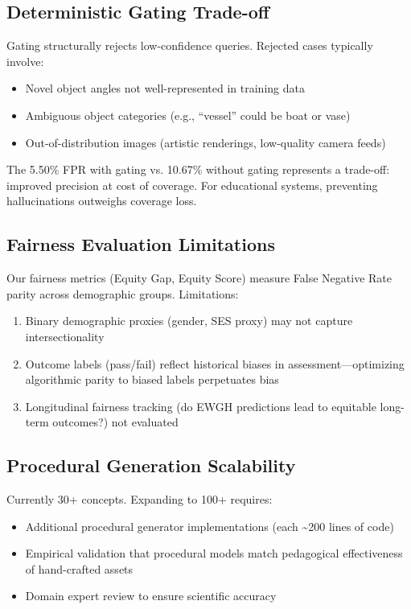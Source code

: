 \documentclass[conference]{IEEEtran}
\begin{document}
\subsection{Deterministic Gating Trade-off}

Gating structurally rejects low-confidence queries. Rejected cases typically involve:
\begin{itemize}
    \item Novel object angles not well-represented in training data
    \item Ambiguous object categories (e.g., ``vessel'' could be boat or vase)
    \item Out-of-distribution images (artistic renderings, low-quality camera feeds)
\end{itemize}

The 5.50\% FPR with gating vs. 10.67\% without gating represents a trade-off: improved precision at cost of coverage. For educational systems, preventing hallucinations outweighs coverage loss.

\subsection{Fairness Evaluation Limitations}

Our fairness metrics (Equity Gap, Equity Score) measure False Negative Rate parity across demographic groups. Limitations:

\begin{enumerate}
    \item Binary demographic proxies (gender, SES proxy) may not capture intersectionality
    \item Outcome labels (pass/fail) reflect historical biases in assessment---optimizing algorithmic parity to biased labels perpetuates bias
    \item Longitudinal fairness tracking (do EWGH predictions lead to equitable long-term outcomes?) not evaluated
\end{enumerate}

\subsection{Procedural Generation Scalability}

Currently 30+ concepts. Expanding to 100+ requires:
\begin{itemize}
    \item Additional procedural generator implementations (each \textasciitilde 200 lines of code)
    \item Empirical validation that procedural models match pedagogical effectiveness of hand-crafted assets
    \item Domain expert review to ensure scientific accuracy
\end{itemize}
\end{document}
